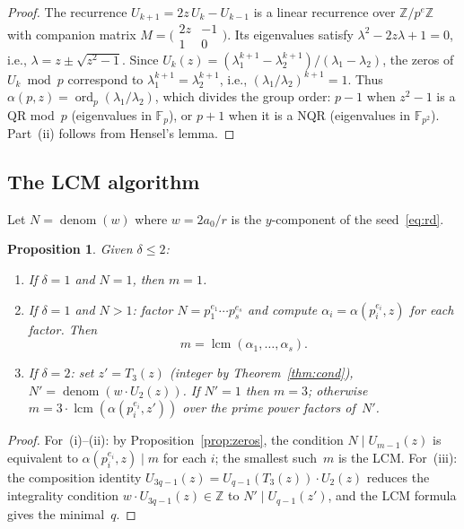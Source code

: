 \documentclass[11pt]{article}
\newtheorem{proposition}[theorem]{Proposition}
\theoremstyle{definition}
\theoremstyle{remark}
\begin{document}
\begin{proof}
The recurrence $U_{k+1} = 2z\,U_k - U_{k-1}$ is a linear recurrence
over $\mathbb{Z}/p^e\mathbb{Z}$ with companion matrix
$M = \bigl(\begin{smallmatrix} 2z & -1 \\ 1 & 0 \end{smallmatrix}\bigr)$.
Its eigenvalues satisfy $\lambda^2 - 2z\lambda + 1 = 0$, i.e.,
$\lambda = z \pm \sqrt{z^2 - 1}$.
Since $U_k(z) = (\lambda_1^{k+1} - \lambda_2^{k+1})/(\lambda_1 - \lambda_2)$,
the zeros of $U_k \bmod p$ correspond to $\lambda_1^{k+1} = \lambda_2^{k+1}$,
i.e., $(\lambda_1/\lambda_2)^{k+1} = 1$.
Thus $\alpha(p, z) = \operatorname{ord}_p(\lambda_1/\lambda_2)$, which
divides the group order: $p-1$ when $z^2-1$ is a QR mod~$p$
(eigenvalues in $\mathbb{F}_p$), or $p+1$ when it is a NQR
(eigenvalues in $\mathbb{F}_{p^2}$).
Part~(ii) follows from Hensel's lemma.
\end{proof}

\subsection{The LCM algorithm}

Let $N = \operatorname{denom}(w)$ where $w = 2a_0/r$ is the $y$-component
of the seed~\eqref{eq:rd}.

\begin{proposition}\label{prop:m}
Given $\delta \le 2$:
\begin{enumerate}
\item[(i)] If $\delta = 1$ and $N = 1$, then $m = 1$.
\item[(ii)] If $\delta = 1$ and $N > 1$: factor
  $N = p_1^{e_1} \cdots p_s^{e_s}$ and compute
  $\alpha_i = \alpha(p_i^{e_i}, z)$ for each factor. Then
  \begin{equation}\label{eq:lcm}
  m = \operatorname{lcm}(\alpha_1, \ldots, \alpha_s).
  \end{equation}
\item[(iii)] If $\delta = 2$: set $z' = T_3(z)$ (integer by
  Theorem~\ref{thm:cond}), $N' = \operatorname{denom}(w \cdot U_2(z))$.
  If $N' = 1$ then $m = 3$; otherwise
  $m = 3 \cdot \operatorname{lcm}(\alpha(p_i^{e_i}, z'))$ over the
  prime power factors of~$N'$.
\end{enumerate}
\end{proposition}

\begin{proof}
For~(i)--(ii): by Proposition~\ref{prop:zeros}, the condition
$N \mid U_{m-1}(z)$ is equivalent to
$\alpha(p_i^{e_i}, z) \mid m$ for each $i$; the smallest such~$m$ is
the LCM.
For~(iii): the composition identity
$U_{3q-1}(z) = U_{q-1}(T_3(z)) \cdot U_2(z)$ reduces the
integrality condition $w \cdot U_{3q-1}(z) \in \mathbb{Z}$ to
$N' \mid U_{q-1}(z')$, and the LCM formula gives the minimal~$q$.
\end{proof}
\end{document}
